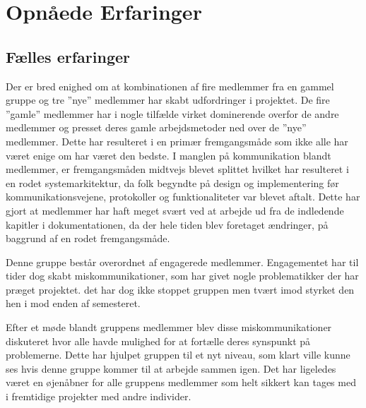 \chapter{Opnåede Erfaringer}
\section{Fælles erfaringer}
Der er bred enighed om at kombinationen af fire medlemmer fra en gammel gruppe og tre ''nye'' medlemmer har skabt udfordringer i projektet. De fire ''gamle'' medlemmer har i nogle tilfælde virket dominerende overfor de andre medlemmer og presset deres gamle arbejdsmetoder ned over de ''nye'' medlemmer. Dette har resulteret i en primær fremgangsmåde som ikke alle har været enige om har været den bedste. I manglen på kommunikation blandt medlemmer, er fremgangsmåden midtvejs blevet splittet hvilket har resulteret i en rodet systemarkitektur, da folk begyndte på design og implementering før kommunikationsvejene, protokoller og funktionaliteter var blevet aftalt. Dette har gjort at medlemmer har haft meget svært ved at arbejde ud fra de indledende kapitler i dokumentationen, da der hele tiden blev foretaget ændringer, på baggrund af en rodet fremgangsmåde.

Denne gruppe består overordnet af engagerede medlemmer. Engagementet har til tider dog skabt miskommunikationer, som har givet nogle problematikker der har præget projektet. det har dog ikke stoppet gruppen men tvært imod styrket den hen i mod enden af semesteret.

Efter et møde blandt gruppens medlemmer blev disse miskommunikationer diskuteret hvor alle havde mulighed for at fortælle deres synspunkt på problemerne. Dette har hjulpet gruppen til et nyt niveau, som klart ville kunne ses hvis denne gruppe kommer til at arbejde sammen igen. Det har ligeledes været en øjenåbner for alle gruppens medlemmer som helt sikkert kan tages med i fremtidige projekter med andre individer.


\clearpage



\clearpage


\clearpage